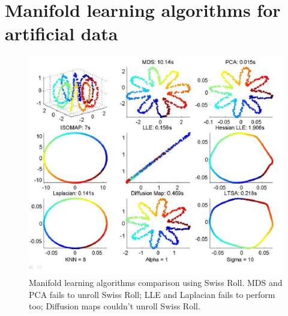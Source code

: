 \chapter{Manifold learning algorithms for artificial data} %
\label{AppendixA} %


\begin{figure}[ht]
\begin{center}
\includegraphics[width=\textwidth]{./Figures/App1.png}
\caption{ Manifold learning algorithms comparison using Swiss Roll. MDS and PCA fails to unroll Swiss Roll; LLE and Laplacian fails to perform too; Diffusion maps couldn't unroll Swiss Roll. }
\end{center}
\end{figure}


